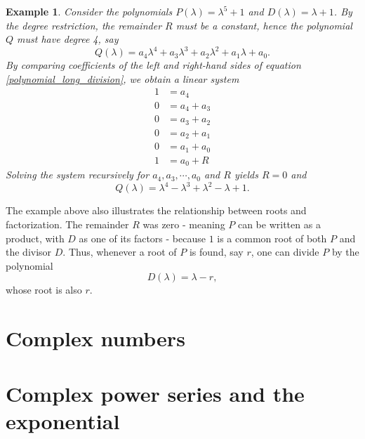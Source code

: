 \documentclass[12pt,oneside]{exam}
\newtheorem{example}{Example}[section]
\begin{document}
\begin{example}
Consider the polynomials $P(\lambda)=\lambda^5 + 1$ and $D(\lambda)=\lambda +1 $. By the degree restriction, the remainder $R$ must be a constant, hence the polynomial $Q$ must have degree 4, say 
\begin{equation*}
Q(\lambda)=a_4\lambda^4 + a_3\lambda^3 + a_2 \lambda^2 + a_1\lambda + a_0.
\end{equation*}
By comparing coefficients of the left and right-hand sides of equation \eqref{polynomial_long_division}, we obtain a linear system
\begin{align*}
1 & = a_4 \\
0 & = a_4 + a_3 \\
0 & = a_3 + a_2 \\
0 & = a_2 + a_1 \\
0 & = a_1 + a_0 \\
1 & = a_0 + R
\end{align*} 
Solving the system recursively for $a_4, a_3, \cdots, a_0$ and $R$ yields $R=0$ and
\begin{equation*}
Q(\lambda)= \lambda^4 - \lambda^3 + \lambda^2 -\lambda +1.
\end{equation*}
\end{example}

The example above also illustrates the relationship between roots and factorization. The remainder $R$ was zero - meaning $P$ can be written as a product, with $D$ as one of its factors - because $1$ is a common root of both $P$ and the divisor $D$. Thus, whenever a root of $P$ is found, say $r$, one can divide $P$ by the polynomial \begin{equation*}
D(\lambda)=\lambda-r,
\end{equation*}  
whose root is also $r$. 
\section{Complex numbers}

\section{Complex power series and the exponential}
\end{document}
